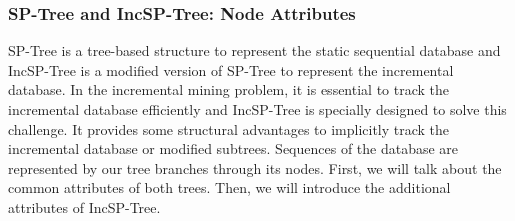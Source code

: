 \subsubsection{SP-Tree and IncSP-Tree: Node Attributes} \label{section:node_attribute}
SP-Tree is a tree-based structure to represent the static sequential database and IncSP-Tree is a modified version of SP-Tree to represent the incremental database. In the incremental mining problem, it is essential to track the incremental database efficiently and IncSP-Tree is specially designed to solve this challenge. It provides some structural advantages to implicitly track the incremental database or modified subtrees. Sequences of the database are represented by our tree branches through its nodes. First, we will talk about the common attributes of both trees. Then, we will introduce the additional attributes of IncSP-Tree.
